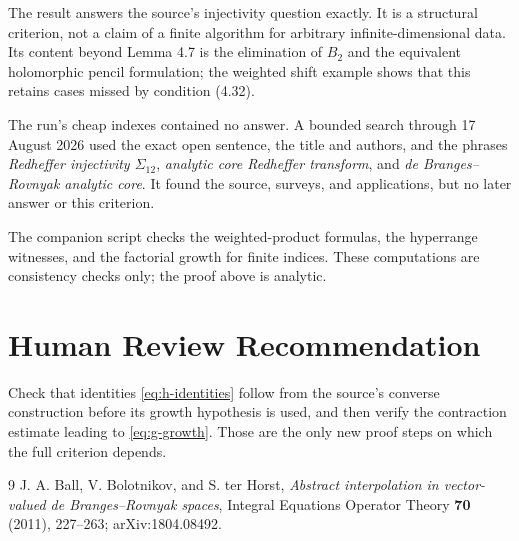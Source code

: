 \documentclass[11pt]{article}
\begin{document}
The result answers the source's injectivity question exactly.  It is a
structural criterion, not a claim of a finite algorithm for arbitrary
infinite-dimensional data.  Its content beyond Lemma 4.7 is the elimination
of $B_2$ and the equivalent holomorphic pencil formulation; the weighted
shift example shows that this retains cases missed by condition (4.32).

The run's cheap indexes contained no answer.  A bounded search through
17 August 2026 used the exact open sentence, the title and authors, and the
phrases \emph{Redheffer injectivity $\Sigma_{12}$}, \emph{analytic core
Redheffer transform}, and \emph{de Branges--Rovnyak analytic core}.  It found
the source, surveys, and applications, but no later answer or this criterion.

The companion script checks the weighted-product formulas, the hyperrange
witnesses, and the factorial growth for finite indices.  These computations
are consistency checks only; the proof above is analytic.

\section*{Human Review Recommendation}

Check that identities \eqref{eq:h-identities} follow from the source's
converse construction before its growth hypothesis is used, and then verify
the contraction estimate leading to \eqref{eq:g-growth}.  Those are the only
new proof steps on which the full criterion depends.

\begin{thebibliography}{9}
\small
{}
J. A. Ball, V. Bolotnikov, and S. ter Horst,
\emph{Abstract interpolation in vector-valued de Branges--Rovnyak spaces},
Integral Equations Operator Theory \textbf{70} (2011), 227--263;
arXiv:1804.08492.
\end{thebibliography}
\end{document}

